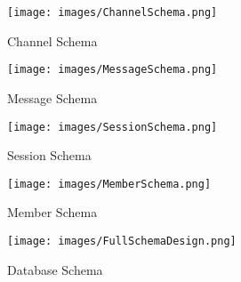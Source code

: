 \begin{figure}[h!]
    \caption{Channel Schema}
    \label{image:channelSchema}
    \centering
    \texttt{[image: images/ChannelSchema.png]}
\end{figure}

\begin{figure}[h!]
    \caption{Message Schema}
    \label{image:messageSchema}
    \centering
    \texttt{[image: images/MessageSchema.png]}
\end{figure}

\begin{figure}[h!]
    \caption{Session Schema}
    \label{image:sessionSchema}
    \centering
    \texttt{[image: images/SessionSchema.png]}
\end{figure}

\begin{figure}[h!]
    \caption{Member Schema}
    \label{image:memberSchema}
    \centering
    \texttt{[image: images/MemberSchema.png]}
\end{figure}

\begin{figure}[h!]
    \caption{Database Schema}
    \label{image:databaseSchema}
    \centering
    \texttt{[image: images/FullSchemaDesign.png]}
\end{figure}